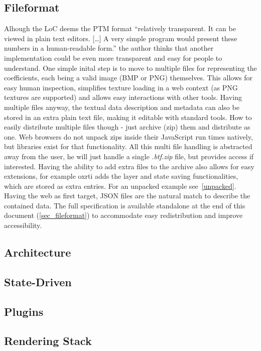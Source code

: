 \subsection{Fileformat}
Alhough the LoC deems the PTM format ``relatively transparent. It can be viewed
in plain text editors. [\ldots] A very simple program would present these
numbers in a human-readable
form.''\cite*{library_of_congress_polynomial_2018} the author thinks that
another implementation could be even more transparent and easy for people to
understand. One simple inital step is to move to multiple files for representing
the coefficients, each being a valid image (BMP or PNG) themselves. This allows
for easy human inspection, simplifies texture loading in a web context (as PNG
textures are supported) and allows easy interactions with other tools. Having
multiple files anyway, the textual data description and metadata can also be
stored in an extra plain text file, making it editable with standard tools. How
to easily distribute multiple files though - just archive (zip) them and distribute as
one. Web browsers do not unpack zips inside their JavaScript run times natively,
but libraries\cite*{noauthor_jszip_nodate} exist for that functionality. All
this multi file handling is abstracted away from the user, he will just handle a
single \emph{.btf.zip} file, but provides access if interested. Having the
ability to add extra files to the archive also allows for easy extensions, for
example oxrti adds the layer and state saving functionalities, which are stored
as extra entries. For an unpacked example see~\autoref{unpacked}. Having the web
as first target, JSON files are the natural match to describe the contained
data. The full specification is available standalone at the end of this document
(\autoref{sec_fileformat}) to accommodate easy redistribution and improve
accessibility.


\subsection{Architecture}

\subsection{State-Driven}
\subsection{Plugins}
\subsection{Rendering Stack}

